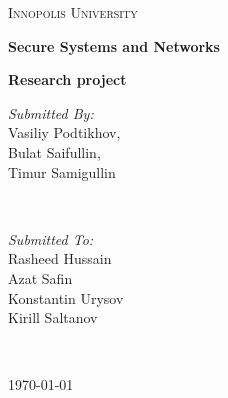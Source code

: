 \documentclass[12pt,a4paper]{report}
\begin{document}
\begin{titlepage}
	\centering
	{\scshape\LARGE Innopolis University \par}
	\vspace{1cm}
	{\huge\bfseries Secure Systems and Networks\par}
	{\huge\bfseries Research project\par}
	\vspace{2cm}
	\vfill

\begin{minipage}{0.4\textwidth}
\begin{flushleft} \large
\emph{Submitted By:}
\\Vasiliy Podtikhov,
\\Bulat Saifullin,
\\Timur Samigullin
\end{flushleft}
\end{minipage}
~
\begin{minipage}{0.4\textwidth}
\begin{flushright} \large
\emph{Submitted To:}
\\Rasheed Hussain
\\Azat Safin
\\Konstantin Urysov
\\Kirill Saltanov
\end{flushright}
\end{minipage}\\[1cm]


	\vfill
	{\large \today\par}
\end{titlepage}

\tableofcontents  %

\begin{abstract}
In modern day social networks become widely used. Practically almost all employers using them. But they can be used to formating public opinion in way not acceptable by company, or by accident share some confidentially information. This often happened because ordinary employee don't unaware of global company goals.

In this work we will try to link a social identity to an IP address by analysis of user traffics. This will help us to establish leakage, find disgruntled employees and change company politics to prevent this situations.
\end{abstract}
\end{document}
